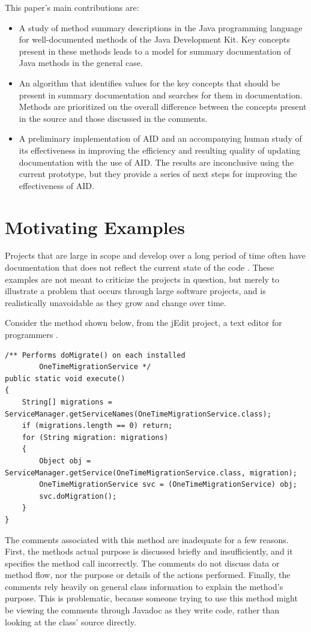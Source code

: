 \documentclass[preprint]{sigplanconf}
\begin{document}
This paper's main contributions are:
\begin{itemize}
\item A study of method summary descriptions in the Java programming language for well-documented methods of the Java Development Kit. Key concepts present in these methods leads to a model for summary documentation of Java methods in the general case.
\item An algorithm that identifies values for the key concepts that should be present in summary documentation and searches for them in documentation. Methods are prioritized on the overall difference between the concepts present in the source and those discussed in the comments.
\item A preliminary implementation of AID and an accompanying human study of its effectiveness in improving the efficiency and resulting quality of updating documentation with the use of AID. The results are inconclusive using the current prototype, but they provide a series of next steps for improving the effectiveness of AID.
\end{itemize}

\section{Motivating Examples}
Projects that are large in scope and develop over a long period of time often have documentation that does not reflect the current state of the code \cite{lethbridge}. These examples are not meant to criticize the projects in question, but merely to illustrate a problem that occurs through large software projects, and is realistically unavoidable as they grow and change over time.

Consider the method shown below, from the jEdit project, a text editor for programmers \cite{jedit}.

\begin{lstlisting}
/** Performs doMigrate() on each installed 
        OneTimeMigrationService */
public static void execute()
{
    String[] migrations = ServiceManager.getServiceNames(OneTimeMigrationService.class);
    if (migrations.length == 0) return;
    for (String migration: migrations)
    {
        Object obj = ServiceManager.getService(OneTimeMigrationService.class, migration);
        OneTimeMigrationService svc = (OneTimeMigrationService) obj;
        svc.doMigration();
    }
}
\end{lstlisting}

The comments associated with this method are inadequate for a few reasons. First, the methods actual purpose is discussed briefly and insufficiently, and it specifies the method call incorrectly. The comments do not discuss data or method flow, nor the purpose or details of the actions performed. Finally, the comments rely heavily on general class information to explain the method's purpose. This is problematic, because someone trying to use this method might be viewing the comments through Javadoc as they write code, rather than looking at the class' source directly.
\end{document}
